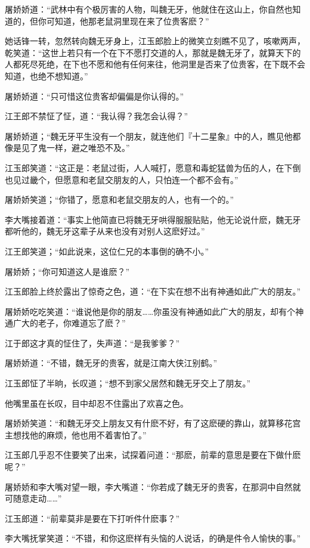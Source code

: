 \documentclass[12pt,oneside]{book}
\begin{document}
屠娇娇道：``武林中有个极厉害的人物，叫魏无牙，他就住在这山上，你自然也知道的，但你可知道，他那老鼠洞里现在来了位贵客麽？''

她话锋一转，忽然转向魏无牙身上，江玉郎脸上的微笑立刻瞧不见了，咳嗽两声，乾笑道：``这世上若只有一个在下不愿打交道的人，那就是魏无牙了，就算天下的人都死尽死绝，在下也不愿和他有任何来往，他洞里是否来了位贵客，在下既不会知道，也绝不想知道。''

屠娇娇道：``只可惜这位贵客却偏偏是你认得的。''

江王郎不禁怔了怔，道：``我认得？我怎会认得？''

屠娇娇道；``魏无牙平生没有一个朋友，就连他们『十二星象』中的人，瞧见他都像是见了鬼一样，避之唯恐不及。''

江玉郎笑道：``这正是：老鼠过街，人人喊打，愿意和毒蛇猛兽为伍的人，在下倒也见过畿个，但愿意和老鼠交朋友的人，只怕连一个都不会有。''

屠娇娇笑道；``你错了，愿意和老鼠交朋友的人，也有一个的。''

李大嘴接着道：``事实上他简直已将魏无牙哄得服服贴贴，他无论说什麽，魏无牙都听他的，魏无牙这辈子从来也没有对别人这麽好过。''

江王郎笑道；``如此说来，这位仁兄的本事倒的确不小。''

屠娇娇；``你可知道这人是谁麽？''

江玉郎脸上终於露出了惊奇之色，道：``在下实在想不出有神通如此广大的朋友。''

屠娇娇吃吃笑道：``谁说他是你的朋友\ldots\ldots 你虽没有神通如此广大的朋友，却有个神通广大的老子，你难道忘了麽？''

江于郎这才真的怔住了，失声道：``是我爹爹？''

屠娇娇道：``不错，魏无牙的贵客，就是江南大侠江别鹤。''

江玉郎怔了半晌，长叹道；``想不到家父居然和魏无牙交上了朋友。''

他嘴里虽在长叹，目中却忍不住露出了欢喜之色。

屠娇娇笑道：``和魏无牙交上朋友又有什麽不好，有了这麽硬的靠山，就算移花宫主想找他的麻烦，他也用不着害怕了。''

江玉郎几乎忍不住要笑了出来，试探着问道：``那麽，前辈的意思是要在下做什麽呢？''

屠娇娇和李大嘴对望一眼，李大嘴道：``你若成了魏无牙的贵客，在那洞中自然就可随意走动\ldots\ldots{}''

江玉郎道：``前辈莫非是要在下打听件什麽事？''

李大嘴抚掌笑道：``不错，和你这麽样有头恼的人说话，的确是件令人愉快的事。''
\end{document}

